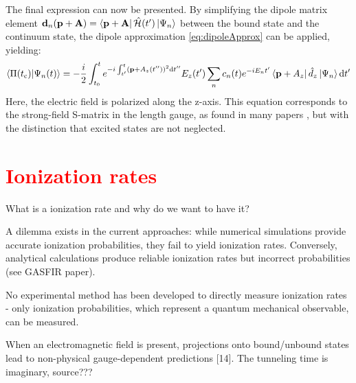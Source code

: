 The final expression can now be presented.
By simplifying the dipole matrix element $\mathbf{d}_n(\mathbf{p}+\mathbf{A}) = \bra{\mathbf{p}+\mathbf{A}}\hat{\mathcal{H}}(t')\ket{\Psi_n}$ between the bound state and the continuum state, the dipole approximation \eqref{eq:dipoleApprox} can be applied, yielding:
\begin{equation*}
    \braket{\Pi(t_{\mathrm{c}})|\Psi_n(t)} = -\frac{i}{2}\int_{t_0}^{t} e^{-i \int_{t'}^{t} (\mathbf{p} + A_z(t''))^2 \mathrm{d} t''}E_z(t')\sum_{n}c_n(t)e^{-iE_nt'}\bra{\mathbf{p}+A_z}\hat{d}_z\ket{\Psi_n} \mathrm{d} t'       \label{eq:smatrix}
\end{equation*}
Here, the electric field is polarized along the z-axis.
This equation corresponds to the strong-field S-matrix in the length gauge, as found in many papers \cite{Theory_NPS}, but with the distinction that excited states are not neglected.




\section{\textcolor{red}{Ionization rates}}
What is a ionization rate and why do we want to have it?

A dilemma exists in the current approaches: while numerical simulations provide accurate ionization probabilities, they fail to yield ionization rates. 
Conversely, analytical calculations produce reliable ionization rates but incorrect probabilities (see GASFIR paper).

No experimental method has been developed to directly measure ionization rates - only ionization probabilities, which represent a quantum mechanical observable, can be measured.

When an electromagnetic field is present, projections onto bound/unbound states lead to non-physical gauge-dependent predictions [14]. %
The tunneling time is imaginary, source??? %












